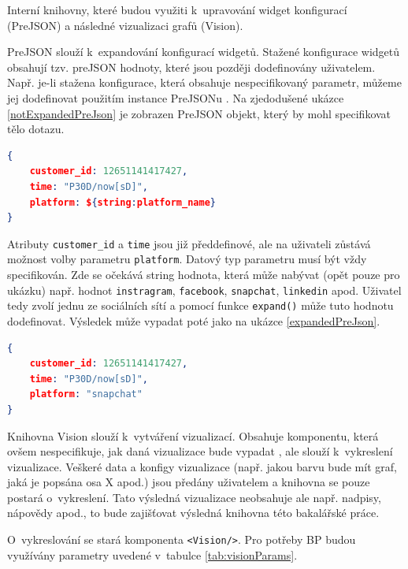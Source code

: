 \documentclass[czech, bc, kiv, he, iso690numb]{fasthesis}
\begin{document}
Interní knihovny, které budou využiti k~upravování widget konfigurací (PreJSON) a následné vizualizaci grafů (Vision).

PreJSON slouží k~expandování konfigurací widgetů. Stažené konfigurace widgetů obsahují tzv. preJSON hodnoty, které jsou později dodefinovány uživatelem. Např. je-li stažena konfigurace, která obsahuje
nespecifikovaný parametr, můžeme jej dodefinovat použitím instance PreJSONu \cite{preJSONDocs}. Na zjedodušené ukázce \ref{notExpandedPreJson} je zobrazen PreJSON objekt, který by mohl specifikovat tělo dotazu. 

\begin{lstlisting}[language=json, caption={Neexpandovaný PreJSON objekt}, label=notExpandedPreJson]
{
	customer_id: 12651141417427,
	time: "P30D/now[sD]",
	platform: ${string:platform_name}
}
\end{lstlisting}
		
Atributy \texttt{customer\_id} a \texttt{time} jsou již předdefinové, ale na uživateli zůstává možnost volby parametru \texttt{platform}. Datový typ parametru musí být vždy specifikován.
Zde se očekává string hodnota, která může nabývat (opět pouze pro ukázku) např. hodnot \texttt{instragram}, \texttt{facebook}, \texttt{snapchat}, \texttt{linkedin} apod. Uživatel tedy zvolí jednu ze sociálních sítí
a pomocí funkce \texttt{expand()} může tuto hodnotu dodefinovat. Výsledek může vypadat poté jako na ukázce \ref{expandedPreJson}.

\begin{lstlisting}[language=json, caption={Expandovaný PreJSON objekt}, label=expandedPreJson]
{
	customer_id: 12651141417427,
	time: "P30D/now[sD]",
	platform: "snapchat"
}
\end{lstlisting}

Knihovna Vision slouží k~vytváření vizualizací. Obsahuje komponentu, která ovšem nespecifikuje, jak daná vizualizace bude vypadat \cite{visionDocs}, ale slouží k~vykreslení vizualizace. 
Veškeré data a konfigy vizualizace (např. jakou barvu bude mít graf, jaká je popsána osa X apod.) jsou předány uživatelem a knihovna se pouze postará o~vykreslení. Tato výsledná vizualizace 
neobsahuje ale např. nadpisy, nápovědy apod., to bude zajišťovat výsledná knihovna této bakalářské práce.

O~vykreslování se stará komponenta \texttt{<Vision/>}. Pro potřeby BP budou využívány parametry uvedené v~tabulce \ref{tab:visionParams}.
\end{document}
